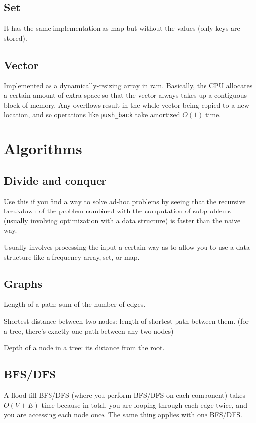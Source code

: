 \documentclass[12pt]{article}
\newcommand{\code}[1]{\texttt{#1}}
\begin{document}
\subsection{Set}
It has the same implementation as map but without the values (only keys are stored).

\subsection{Vector}
Implemented as a dynamically-resizing array in ram. Basically, the CPU allocates a certain
amount of extra space so that the vector always takes up a contiguous block of memory.
Any overflows result in the whole vector being copied to a new location, and so operations
like \code{push\_back} take amortized $O(1)$ time.

\section{Algorithms}

\subsection{Divide and conquer}
Use this if you find a way to solve ad-hoc problems by seeing that
the recursive breakdown of the problem combined with the computation
of subproblems (usually involving optimization with a data structure)
is faster than the naive way.

Usually involves processing the input a certain way as to allow you to
use a data structure like a frequency array, set, or map.

\subsection{Graphs}
Length of a path: sum of the number of edges.

Shortest distance between two nodes: length of shortest path
between them. (for a tree, there's exactly one path between any two nodes)

Depth of a node in a tree: its distance from the root.

\subsection{BFS/DFS}
A flood fill
BFS/DFS (where you perform BFS/DFS on each component) takes $O(V+E)$ time because in total, you are looping through each edge twice,
and you are accessing each node once. The same thing applies with one
BFS/DFS.
\end{document}
